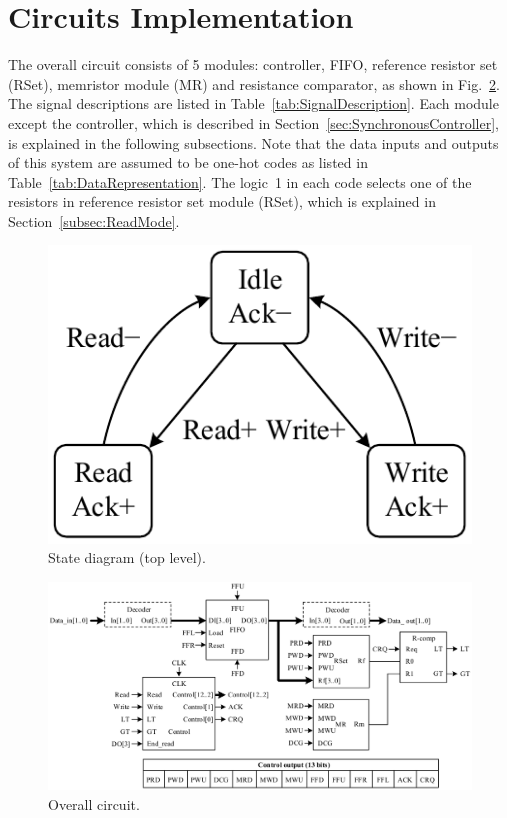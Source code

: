 \documentclass[twocolumn,conference]{IEEEtran}
\begin{document}
\section{Circuits Implementation}
\label{sec:CircuitsImplementation}
The overall circuit consists of 5 modules: controller, FIFO, reference resistor set (RSet), memristor module (MR) and resistance comparator, as shown in Fig.~\ref{fig:System}. The signal descriptions are listed in Table~\ref{tab:SignalDescription}. Each module except the controller, which is described in Section~\ref{sec:SynchronousController}, is explained in the following subsections. Note that the data inputs and outputs of this system are assumed to be one-hot codes as listed in Table~\ref{tab:DataRepresentation}. The logic~1 in each code selects one of the resistors in reference resistor set module (RSet), which is explained in Section~\ref{subsec:ReadMode}. 
\begin{figure}[ht]
    \centering
    \includegraphics[scale=0.5]{figs/StateDiagramTopV4}
    \caption{State diagram (top level).}
    \label{fig:StateDiagramTop}
\end{figure}
\begin{figure}[ht]
    \centering
    \includegraphics[scale=0.7]{figs/SystemV5}
    \caption{Overall circuit.}
    \label{fig:System}
\end{figure}
\end{document}
